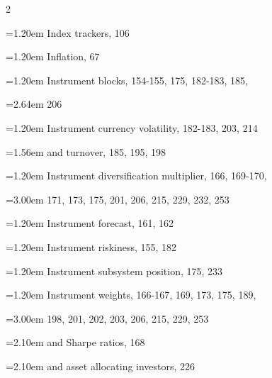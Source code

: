{\begin{multicols}{2}
\par \noindent\hangindent=1.20em\hspace*{0.00em} Index trackers, 106
\par \noindent\hangindent=1.20em\hspace*{0.00em} Inflation, 67
\par \noindent\hangindent=1.20em\hspace*{0.00em} Instrument blocks, 154-155, 175, 182-183, 185,
\par \noindent\hangindent=2.64em\hspace*{1.44em} 206
\par \noindent\hangindent=1.20em\hspace*{0.00em} Instrument currency volatility, 182-183, 203, 214
\par \noindent\hangindent=1.56em\hspace*{0.36em} and turnover, 185, 195, 198
\par \noindent\hangindent=1.20em\hspace*{0.00em} Instrument diversification multiplier, 166, 169-170,
\par \noindent\hangindent=3.00em\hspace*{1.80em} 171, 173, 175, 201, 206, 215, 229, 232, 253
\par \noindent\hangindent=1.20em\hspace*{0.00em} Instrument forecast, 161, 162
\par \noindent\hangindent=1.20em\hspace*{0.00em} Instrument riskiness, 155, 182
\par \noindent\hangindent=1.20em\hspace*{0.00em} Instrument subsystem position, 175, 233
\par \noindent\hangindent=1.20em\hspace*{0.00em} Instrument weights, 166-167, 169, 173, 175, 189,
\par \noindent\hangindent=3.00em\hspace*{1.80em} 198, 201, 202, 203, 206, 215, 229, 253
\par \noindent\hangindent=2.10em\hspace*{0.90em} and Sharpe ratios, 168
\par \noindent\hangindent=2.10em\hspace*{0.90em} and asset allocating investors, 226

\end{multicols}}
